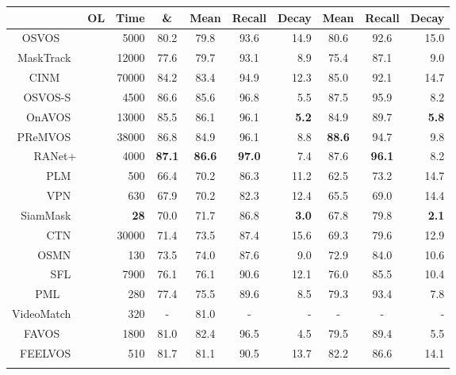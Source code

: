 \documentclass[10pt,twocolumn,letterpaper]{article}
\newcommand{\cmark}{\ding{51}}\newcommand{\xmark}{\ding{55}}\usepackage{booktabs}
\begin{document}
\begin{table*}[htbp]
\vspace{-2mm}
\centering
\begin{tabular}{r||c|r|c|ccr|ccr}
\Xhline{1pt}
\rowcolor[rgb]{ .873,  .91,  0.95}
\multicolumn{1}{c||}{Method} & \multicolumn{1}{l|}{OL} & Time & \& &  Mean &  Recall  &  Decay  &  Mean  &  Recall  &  Decay
\\
\hline
\hline
OSVOS\ \ ~\cite{osvos} & \cmark
& 5000 & 80.2 & 79.8 & 93.6 & 14.9 & 80.6 & 92.6 & 15.0
\\
\rowcolor[rgb]{ .94,  .94,  .94}
MaskTrack~\cite{masktrack}  & \cmark
& 12000 & 77.6 & 79.7 & 93.1 & 8.9  & 75.4 & 87.1 & 9.0
\\
CINM\ \ ~\cite{cinm} & \cmark
& 70000 & 84.2 & 83.4 & 94.9 & 12.3 & 85.0 & 92.1 & 14.7  
\\
\rowcolor[rgb]{ .94,  .94,  .94}
OSVOS-S~\cite{osvos-s} & \cmark
& 4500 & 86.6 & 85.6 & 96.8 & 5.5 & 87.5 & 95.9 & 8.2 
\\
OnAVOS~\cite{onavos} & \cmark
& 13000 & 85.5 & 86.1 & 96.1 & \textbf{5.2} & 84.9 & 89.7 & \textbf{5.8} 
\\
\rowcolor[rgb]{ .94,  .94,  .94}
PReMVOS~\cite{premvos} & \cmark
& 38000 & 86.8 & 84.9 & 96.1 & 8.8 & \textbf{88.6} & 94.7 & 9.8 
\\
\hline
RANet+ & \cmark
& 4000 &
\textbf{87.1} & \textbf{86.6} & \textbf{97.0} & 7.4 & 87.6 & \textbf{96.1} & 8.2
\\
\hline
\hline
\rowcolor[rgb]{ .94,  .94,  .94}
PLM~\cite{plm}  & \xmark
& 500 & 66.4 & 70.2 & 86.3 & 11.2 & 62.5 & 73.2 & 14.7
\\
VPN~\cite{vpn}  & \xmark     
& 630 & 67.9 & 70.2 & 82.3 & 12.4 & 65.5 & 69.0 & 14.4 
\\
\rowcolor[rgb]{ .94,  .94,  .94}
SiamMask~\cite{siammask} & \xmark   
& \textbf{28} & 70.0 & 71.7 & 86.8 & \textbf{3.0} & 67.8 & 79.8 & \textbf{2.1}  
\\
CTN~\cite{ctn}  & \xmark    
& 30000 & 71.4 & 73.5 & 87.4 & 15.6 & 69.3 & 79.6 & 12.9 
\\
\rowcolor[rgb]{ .94,  .94,  .94}
OSMN~\cite{osmn} & \xmark    
& 130 & 73.5 & 74.0 & 87.6 & 9.0 & 72.9 & 84.0 & 10.6
\\
SFL~\cite{sfl}  & \xmark     
& 7900 & 76.1 & 76.1 & 90.6 & 12.1 & 76.0   & 85.5 & 10.4
\\
\rowcolor[rgb]{ .94,  .94,  .94}
PML\ \ ~\cite{pml}  & \xmark    
& 280 & 77.4 & 75.5 & 89.6 & 8.5 & 79.3 & 93.4 & 7.8  
\\
VideoMatch~\cite{videomatch} & \xmark  
& 320    & -    & 81.0   & -    & -    & -    & -    & -   
\\
\rowcolor[rgb]{ .94,  .94,  .94}
FAVOS\ \ ~\cite{favos} & \xmark   
& 1800 & 81.0 & 82.4 & 96.5 & 4.5 & 79.5 & 89.4 & 5.5  
\\
FEELVOS~\cite{Voigtlaender2019FEELVOS} & \xmark  
& 510 & 81.7 & 81.1 & 90.5 & 13.7 & 82.2 & 86.6 & 14.1 
\\
\rowcolor[rgb]{ .94,  .94,  .94}



\end{tabular}
\end{table*}
\end{document}
